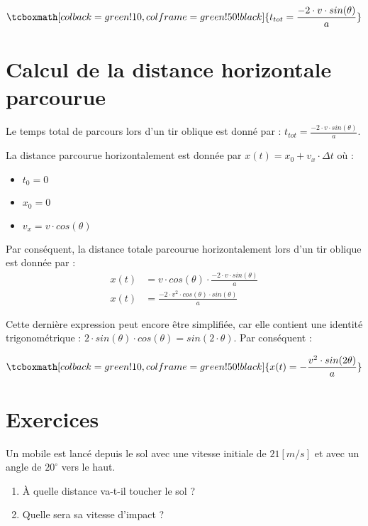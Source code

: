 \begin{equation}
    \tcboxmath[colback=green!10,colframe=green!50!black]{t_{tot}=\frac{-2 \cdot v \cdot sin(\theta)}{a}}
\end{equation}

\section{Calcul de la distance horizontale parcourue}
Le temps total de parcours lors d'un tir oblique est donné par : \(t_{tot}=\frac{-2 \cdot v \cdot sin(\theta)}{a}\).

La distance parcourue horizontalement est donnée par \(x(t)=x_0+v_x \cdot \Delta t\) où :
\begin{itemize}[label=\textbullet]
    \item \(t_0=0\)
    \item \(x_0=0\)
    \item \(v_x=v \cdot cos(\theta)\)
\end{itemize}

Par conséquent, la distance totale parcourue horizontalement lors d'un tir oblique est donnée par :
\begin{align}
    x(t) & =v \cdot cos(\theta) \cdot \frac{-2 \cdot v \cdot sin(\theta)}{a} \\
    x(t) & =\frac{-2 \cdot v^2 \cdot cos(\theta) \cdot sin(\theta)}{a}
\end{align}

Cette dernière expression peut encore être simplifiée, car elle contient une identité trigonométrique : \(2 \cdot sin(\theta) \cdot cos(\theta)=sin(2 \cdot \theta )\).
Par conséquent :

\begin{equation}
    \tcboxmath[colback=green!10,colframe=green!50!black]
    {x(t)=-\frac{v^2 \cdot sin(2 \theta)}{a}}
\end{equation}

\newpage

\section{Exercices}
\begin{exercise}
    Un mobile est lancé depuis le sol avec une vitesse initiale de \(21\unit{[m/s]}\) et avec un angle de \(20^{\circ}\) vers le haut.
    \begin{enumerate}[label=\alph*)]
        \item À quelle distance va-t-il toucher le sol ?
        \item Quelle sera sa vitesse d'impact ?
    \end{enumerate}
\end{exercise}

